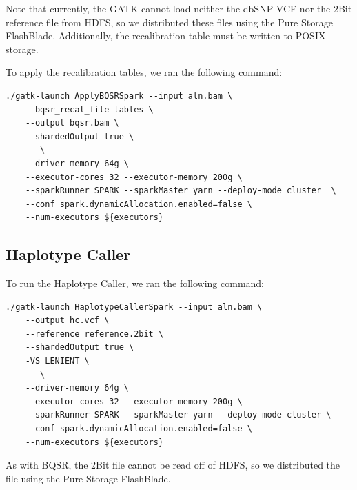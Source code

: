 \documentclass[phd]{ucbthesis}
\begin{document}
Note that currently, the GATK cannot load neither the dbSNP VCF nor the 2Bit
reference file from HDFS, so we distributed these files using the Pure Storage
FlashBlade. Additionally, the recalibration table must be written to POSIX
storage.

To apply the recalibration tables, we ran the following command:

\begin{lstlisting}[caption=GATK4 BQSR Table Apply Command]
./gatk-launch ApplyBQSRSpark --input aln.bam \
    --bqsr_recal_file tables \
    --output bqsr.bam \
    --shardedOutput true \
    -- \
    --driver-memory 64g \
    --executor-cores 32 --executor-memory 200g \
    --sparkRunner SPARK --sparkMaster yarn --deploy-mode cluster  \
    --conf spark.dynamicAllocation.enabled=false \
    --num-executors ${executors}
\end{lstlisting}

\subsection{Haplotype Caller}
\label{sec:gatk-hc}

To run the Haplotype Caller, we ran the following command:

\begin{lstlisting}[caption=GATK4 HaplotypeCaller Command]
./gatk-launch HaplotypeCallerSpark --input aln.bam \
    --output hc.vcf \
    --reference reference.2bit \
    --shardedOutput true \
    -VS LENIENT \
    -- \
    --driver-memory 64g \
    --executor-cores 32 --executor-memory 200g \
    --sparkRunner SPARK --sparkMaster yarn --deploy-mode cluster \
    --conf spark.dynamicAllocation.enabled=false \
    --num-executors ${executors}
\end{lstlisting}

As with BQSR, the 2Bit file cannot be read off of HDFS, so we distributed the
file using the Pure Storage FlashBlade.
\end{document}
